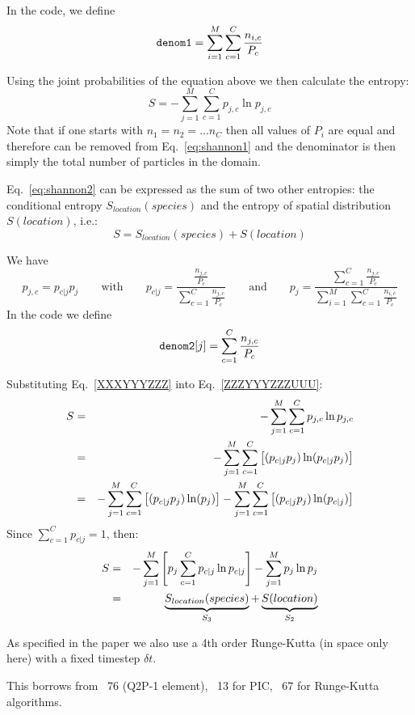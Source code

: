 In the code, we define
\[
{\tt denom1}=\sum\limits_{i=1}^M \sum\limits_{c=1}^C \frac{n_{i,c}}{P_c}
\]

Using the joint probabilities of the equation above we then calculate the entropy:
\begin{equation}
S= -\sum_{j=1}^M \sum_{c=1}^C p_{j,c} \ln p_{j,c}
\label{eq:shannon2}
\end{equation}
Note that if one starts with $n_1=n_2=...n_C$ then all values of $P_i$ are equal and 
therefore can be removed from Eq.~\eqref{eq:shannon1} and the denominator is then simply 
the total number of particles in the domain.

Eq.~\eqref{eq:shannon2} can be expressed as the sum of two other entropies:
the conditional entropy $S_{location}(species)$ and the entropy of spatial 
distribution $S(location)$, i.e.:
\[
S=S_{location}(species) + S(location)
\]

We have 
\[
p_{j,c} = p_{c|j}p_j
\qquad
\text{with}
\qquad
p_{c|j}=\frac{\frac{n_{j,c}}{P_c}}{\sum\limits_{c=1}^C \frac{n_{j,c}}{P_c}}
\qquad
\text{and}
\qquad
p_j=\frac{\sum\limits_{c=1}^C \frac{n_{j,c}}{P_c}}{\sum\limits_{i=1}^M \sum\limits_{c=1}^C \frac{n_{i,c}}{P_c}} 
\]
In the code we define 
\[
{\tt denom2}[j]=\sum\limits_{c=1}^C \frac{n_{j,c}}{P_c}
\]


Substituting Eq.~\eqref{XXXYYYZZZ} into Eq.~\eqref{ZZZYYYZZZUUU}:
\begin{eqnarray}
S
&=& -\sum_{j=1}^M \sum_{c=1}^C p_{j,c} \ln p_{j,c} \nonumber\\
&=& -\sum_{j=1}^M \sum_{c=1}^C \left[ (p_{c|j}p_j) \ln (p_{c|j}p_j) \right] \nonumber\\
&=& -\sum_{j=1}^M \sum_{c=1}^C \left[ (p_{c|j}p_j) \ln (p_j) \right] 
    -\sum_{j=1}^M \sum_{c=1}^C \left[ (p_{c|j}p_j) \ln (p_{c|j}) \right] \nonumber\\
\end{eqnarray}
Since $\sum\limits_{c=1}^C p_{c|j}=1$, then:
\begin{eqnarray}
S
&=&-\sum_{j=1}^M \left[
p_j \sum_{c=1}^C p_{c|j} \ln p_{c|j}
\right]
-
\sum_{j=1}^M p_j \ln p_j \nonumber\\
&=& 
\underbrace{S_{location}(species)}_{S_3} + \underbrace{S(location)}_{S_2}
\end{eqnarray}



As specified in the paper we also use a 4th order Runge-Kutta (in space only here)
with a fixed timestep $\delta t$.

This \stone borrows from \stone~76 (Q2P-1 element), \stone~13 for PIC, 
\stone~67 for Runge-Kutta algorithms.

